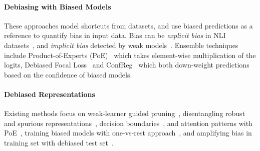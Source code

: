 \paragraph{Debiasing with Biased Models} These approaches model shortcuts from datasets, and use biased predictions as a reference to quantify bias in input data. Bias can be \emph{explicit bias} in NLI datasets~\citep{belinkov-etal-2019-dont,clark-etal-2019-dont,karimi-mahabadi-etal-2020-end,utama-etal-2020-mind}, and \emph{implicit bias} detected by weak models~\citep{ghaddar-etal-2021-end,sanh2020learning,meissner-etal-2022-debiasing,utama-etal-2020-towards,meissner-etal-2022-debiasing}. 
Ensemble techniques include Product-of-Experts (PoE)~\citep{10.1162/089976602760128018,sanh2020learning,cheng24c_interspeech} which takes element-wise multiplication of the logits, Debiased Focal Loss~\citep{karimi-mahabadi-etal-2020-end} and ConfReg~\citep{utama-etal-2020-mind} which both down-weight predictions based on the confidence of biased models.


\paragraph{Debiased Representations} Existing methods focus on weak-learner guided pruning~\citep{meissner-etal-2022-debiasing}, disentangling robust and spurious representations~\citep{gao-etal-2022-kernel}, 
decision boundaries~\citep{lyu2023feature}, and
attention patterns with PoE~\citep{wang-etal-2023-robust}, 
training biased models with one-vs-rest approach~\citep{jeon-etal-2023-improving}, and amplifying bias in training set with debiased test set~\citep{reif-schwartz-2023-fighting}.






